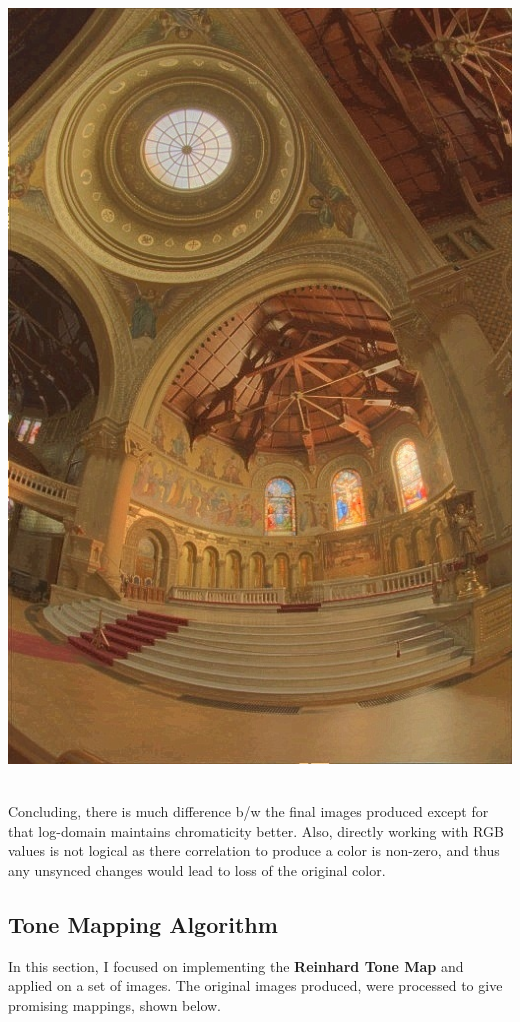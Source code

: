 \documentclass{article}
\begin{document}
\begin{itemize}
        \includegraphics[scale=.25]{./data/2/lg/s3.jpg}
    \end{itemize}
    \\
    Concluding, there is much difference b/w the final images produced except for that log-domain maintains chromaticity better. Also, directly working with RGB values is not logical as there correlation to produce a color is non-zero, and thus any unsynced changes would lead to loss of the original color.
    
    \pagebreak
    \subsection*{Tone Mapping Algorithm}
    In this section, I focused on implementing the \textbf{Reinhard Tone Map} and applied on a set of images. The original images produced, were processed to give promising mappings, shown below.
\end{document}

